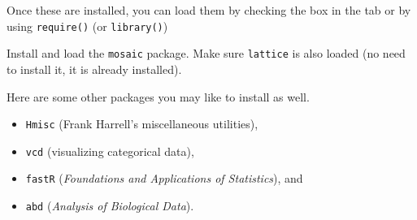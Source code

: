 \begin{knitrout}
\end{knitrout}


Once these are installed, you can load them by checking the box in the 
 tab or by using \verb!require()! (or \verb!library()!)

\begin{knitrout}
\end{knitrout}


\begin{problem}
Install and load the \verb!mosaic! package.
Make sure \verb!lattice! is also loaded (no need to install it, it is already installed).

Here are some other packages you may like to install as well.
\begin{itemize}
\item
\verb!Hmisc! (Frank Harrell's miscellaneous utilities),
\item
\verb!vcd! (visualizing categorical data),
\item
\verb!fastR! (\textit{Foundations and Applications of Statistics}), and 
\item
\verb!abd! (\textit{Analysis of Biological Data}).
\end{itemize}
\end{problem}


